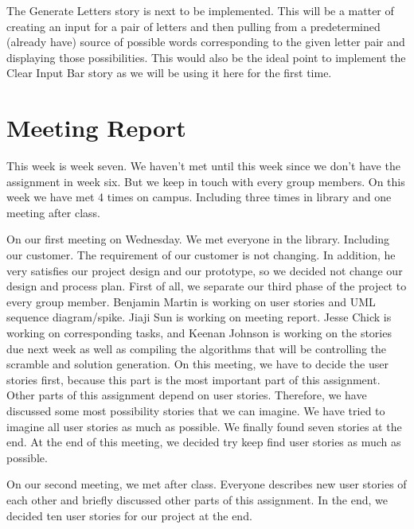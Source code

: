 \documentclass[12pt]{article}
\begin{document}
\par
The Generate Letters story is next to be implemented. This will be a matter of creating an input for a pair of letters and then pulling from a predetermined (already have) source of possible words corresponding to the given letter pair and displaying those possibilities. This would also be the ideal point to implement the Clear Input Bar story as we will be using it here for the first time. \\

\section{Meeting Report}

\par
This week is week seven. We haven’t met until this week since we don’t have the assignment in week six. But we keep in touch with every group members. On this week we have met 4 times on campus. Including three times in library and one meeting after class. \\

\par
On our first meeting on Wednesday. We met everyone in the library. Including our customer. The requirement of our customer is not changing. In addition, he very satisfies our project design and our prototype, so we decided not change our design and process plan. First of all, we separate our third phase of the project to every group member. Benjamin Martin is working on user stories and UML sequence diagram/spike. Jiaji Sun is working on meeting report. Jesse Chick is working on corresponding tasks, and Keenan Johnson is working on the stories due next week as well as compiling the algorithms that will be controlling the scramble and solution generation. On this meeting, we have to decide the user stories first, because this part is the most important part of this assignment. Other parts of this assignment depend on user stories. Therefore, we have discussed some most possibility stories that we can imagine. We have tried to imagine all user stories as much as possible. We finally found seven stories at the end. At the end of this meeting, we decided try keep find user stories as much as possible. \\

\par
 On our second meeting, we met after class. Everyone describes new user stories of each other and briefly discussed other parts of this assignment. In the end, we decided ten user stories for our project at the end. \\
 
\end{document}
